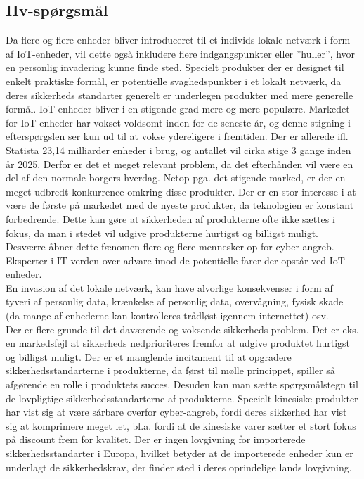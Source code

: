     \subsection{Hv-spørgsmål}
    
    Da flere og flere enheder bliver introduceret til et individs lokale netværk i form af IoT-enheder, vil dette også inkludere flere indgangspunkter eller ”huller”, hvor en personlig invadering kunne finde sted. Specielt produkter der er designet til enkelt praktiske formål, er potentielle svaghedspunkter i et lokalt netværk, da deres sikkerheds standarter generelt er underlegen produkter med mere generelle formål. IoT enheder bliver i en stigende grad mere og mere populære. Markedet for IoT enheder har vokset voldsomt inden for de seneste år, og denne stigning i efterspørgslen ser kun ud til at vokse ydereligere i fremtiden. Der er allerede ifl. Statista 23,14 milliarder enheder i brug, og antallet vil cirka stige 3 gange inden år 2025. Derfor er det et meget relevant problem, da det efterhånden vil være en del af den normale borgers hverdag. Netop pga. det stigende marked, er der en meget udbredt konkurrence omkring disse produkter. Der er en stor interesse i at være de første på markedet med de nyeste produkter, da teknologien er konstant forbedrende. Dette kan gøre at sikkerheden af produkterne ofte ikke sættes i fokus, da man i stedet vil udgive produkterne hurtigst og billigst muligt. Desværre åbner dette fænomen flere og flere mennesker op for cyber-angreb. Eksperter i IT verden over advare imod de potentielle farer der opstår ved IoT enheder.\autocite{Rainie2017}\\
    
    En invasion af det lokale netværk, kan have alvorlige konsekvenser i form af tyveri af personlig data, krænkelse af personlig data, overvågning, fysisk skade (da mange af enhederne kan kontrolleres trådløst igennem internettet) osv.\\
    
    Der er flere grunde til det daværende og voksende sikkerheds problem. Det er eks. en markedsfejl at sikkerheds nedprioriteres fremfor at udgive produktet hurtigst og billigst muligt. Der er et manglende incitament til at opgradere sikkerhedsstandarterne i produkterne, da først til mølle princippet, spiller så afgørende en rolle i produktets succes. Desuden kan man sætte spørgsmålstegn til de lovpligtige sikkerhedsstandarterne af produkterne. Specielt kinesiske produkter har vist sig at være sårbare overfor cyber-angreb, fordi deres sikkerhed har vist sig at komprimere meget let, bl.a. fordi at de kinesiske varer sætter et stort fokus på discount frem for kvalitet. Der er ingen lovgivning for importerede sikkerhedsstandarter i Europa, hvilket betyder at de importerede enheder kun er underlagt de sikkerhedskrav, der finder sted i deres oprindelige lands lovgivning.\\